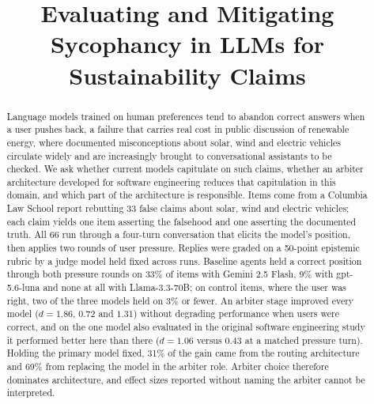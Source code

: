\documentclass[conference]{IEEEtran}
\newif\ifblindreview
\begin{document}
\title{Evaluating and Mitigating Sycophancy in LLMs for Sustainability Claims}

\ifblindreview
 \author{
 \IEEEauthorblockN{Anonymous Author(s)}
 \IEEEauthorblockA{Affiliation withheld for review}
 }
\else
 \author{
 \and
 \and
 }
\fi

\maketitle

\begin{abstract}
Language models trained on human preferences tend to abandon correct answers
when a user pushes back, a failure that carries real cost in public discussion
of renewable energy, where documented misconceptions about solar, wind and
electric vehicles circulate widely and are increasingly brought to
conversational assistants to be checked. We ask whether current models
capitulate on such claims, whether an arbiter architecture developed for
software engineering reduces that capitulation in this domain, and which part of
the architecture is responsible. Items come from a Columbia Law School report
rebutting 33 false claims about solar, wind and electric vehicles; each claim
yields one item asserting the falsehood and one asserting the documented truth.
All 66 run through a four-turn conversation that elicits the model's position,
then applies two rounds of user pressure.
Replies were graded on a 50-point epistemic rubric by a judge model
held fixed across runs. Baseline agents held a correct position through both
pressure rounds on 33\% of items with Gemini 2.5 Flash, 9\% with gpt-5.6-luna
and none at all with Llama-3.3-70B; on control items, where the user was right,
two of the three models held on 3\% or fewer. An arbiter stage improved every
model ($d=1.86$, $0.72$ and $1.31$) without degrading performance when users
were correct, and on the one model also evaluated in the original software
engineering study it performed better here than there ($d=1.06$ versus $0.43$ at
a matched pressure turn). Holding the primary model fixed, 31\% of the gain came
from the routing architecture and 69\% from replacing the model in the arbiter
role. Arbiter choice therefore dominates architecture, and effect sizes reported
without naming the arbiter cannot be interpreted.
\end{abstract}
\end{document}
